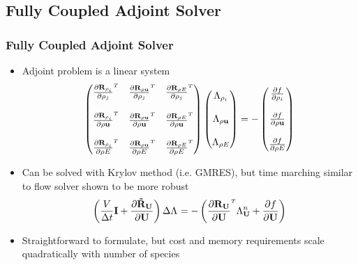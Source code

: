 \documentclass{beamer}
\begin{document}
\subsection{Fully Coupled Adjoint Solver}

\begin{frame}
  \frametitle{Fully Coupled Adjoint Solver}
  \begin{itemize}
    \item Adjoint problem is a linear system
      \begin{equation*}
        \begin{pmatrix}
          \rtdiff{\rho_i}{\rho_j} & 
          \rtdiff{\rho \vu}{\rho_j} & 
          \rtdiff{\rho E}{\rho_j} \\
          \\
          \rtdiff{\rho_i}{\rho \vu} & 
          \rtdiff{\rho \vu}{\rho \vu} & 
          \rtdiff{\rho E}{\rho \vu} \\
          \\
          \rtdiff{\rho_i}{\rho E} &
          \rtdiff{\rho \vu}{\rho E} &
          \rtdiff{\rho E}{\rho E}
        \end{pmatrix}
        \begin{pmatrix}
          \adjlam{\rho_i} \\ \\
          \adjlam{\rho \vu} \\ \\
          \adjlam{\rho E}
        \end{pmatrix}
        = -
        \begin{pmatrix}
          \pd{f}{\rho_i} \\ \\
          \pd{f}{\rho \vu} \\ \\
          \pd{f}{\rho E}
        \end{pmatrix}
      \end{equation*}
    \item Can be solved with Krylov method (i.e. GMRES), but time marching
      similar to flow solver shown to be more robust
      \begin{equation*}
        \left( \frac{V}{\Delta t} \mi + \druduapprox \right)
        \Delta \adjlam{}
        = - \left( \rtdiff{\mU}{\mU} \adjlam{\mU}^{n} + \pd{f}{\mU} \right)
      \end{equation*}
    \item Straightforward to formulate, but cost and memory requirements
      scale quadratically with number of species
      
  \end{itemize}
\end{frame}
\end{document}
